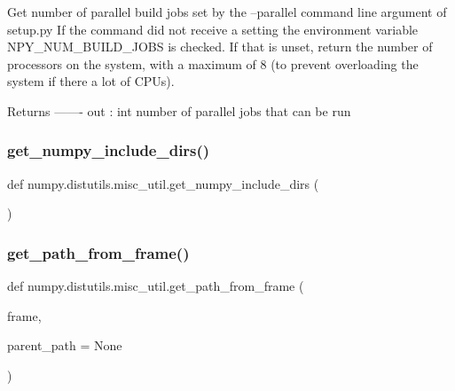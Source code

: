 \begin{DoxyVerb}Get number of parallel build jobs set by the --parallel command line
argument of setup.py
If the command did not receive a setting the environment variable
NPY_NUM_BUILD_JOBS is checked. If that is unset, return the number of
processors on the system, with a maximum of 8 (to prevent
overloading the system if there a lot of CPUs).

Returns
-------
out : int
    number of parallel jobs that can be run\end{DoxyVerb}
 \mbox{\label{namespacenumpy_1_1distutils_1_1misc__util_a7df9726661488fc7754069f949cd2d6f}} 
\subsubsection{\texorpdfstring{get\+\_\+numpy\+\_\+include\+\_\+dirs()}{get\_numpy\_include\_dirs()}}
{\footnotesize\ttfamily def numpy.\+distutils.\+misc\+\_\+util.\+get\+\_\+numpy\+\_\+include\+\_\+dirs (\begin{DoxyParamCaption}{ }\end{DoxyParamCaption})}

\mbox{\label{namespacenumpy_1_1distutils_1_1misc__util_af2afbcadab9f2c9c77d7deb631d35451}} 
\subsubsection{\texorpdfstring{get\+\_\+path\+\_\+from\+\_\+frame()}{get\_path\_from\_frame()}}
{\footnotesize\ttfamily def numpy.\+distutils.\+misc\+\_\+util.\+get\+\_\+path\+\_\+from\+\_\+frame (\begin{DoxyParamCaption}\item[{}]{frame,  }\item[{}]{parent\+\_\+path = {\ttfamily None} }\end{DoxyParamCaption})}

